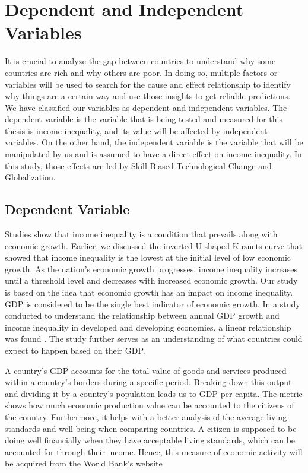 \section{Dependent and Independent Variables}
\hspace{20pt} It is crucial to analyze the gap between countries to understand why some countries are rich and why others are poor. In doing so, multiple factors or variables will be used to search for the cause and effect relationship to identify why things are a certain way and use those insights to get reliable predictions. We have classified our variables as dependent and independent variables. The dependent variable is the variable that is being tested and measured for this thesis is income inequality, and its value will be affected by independent variables. On the other hand, the independent variable is the variable that will be manipulated by us and is assumed to have a direct effect on income inequality. In this study, those effects are led by Skill-Biased Technological Change and Globalization.

\subsection{Dependent Variable}

\hspace{20pt} Studies show that income inequality is a condition that prevails along with economic growth. Earlier, we discussed the inverted  U-shaped Kuznets curve that showed that income inequality is the lowest at the initial level of low economic growth. As the nation’s economic growth progresses, income inequality increases until a threshold level and decreases with increased economic growth. Our study is based on the idea that economic growth has an impact on income inequality. GDP is considered to be the single best indicator of economic growth. In a study conducted to understand the relationship between annual GDP growth and income inequality in developed and developing economies, a linear relationship was found \cite{luan2017relationship}. The study further serves as an understanding of what countries could expect to happen based on their GDP. 

A country's GDP accounts for the total value of goods and services produced within a country's borders during a specific period. Breaking down this output and dividing it by a country's population leads us to GDP per capita. The metric shows how much economic production value can be accounted to the citizens of the country. Furthermore, it helps with a better analysis of the average living standards and well-being when comparing countries. A citizen is supposed to be doing well financially when they have acceptable living standards, which can be accounted for through their income. Hence, this measure of economic activity will be acquired from the World Bank’s website


